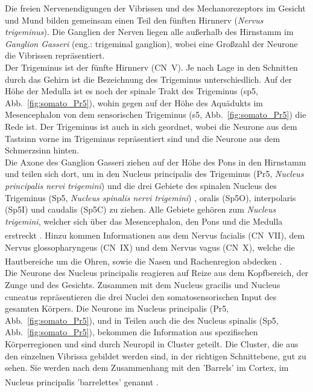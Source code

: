 Die freien Nervenendigungen der Vibrissen und des Mechanorezeptors im Gesicht und Mund bilden gemeinsam einen Teil den fünften Hirnnerv (\textit{Nervus trigeminus}). Die Ganglien der Nerven liegen alle außerhalb des Hirnstamm im \textit{Ganglion Gasseri} (eng.: trigeminal ganglion), wobei eine Großzahl der Neurone die Vibrissen repräsentiert.
\\
\noindent
Der Trigeminus ist der fünfte Hirnnerv (CN~V). Je nach Lage in den Schnitten durch das Gehirn ist die Bezeichnung des Trigeminus unterschiedlich. Auf der Höhe der Medulla ist es noch der spinale Trakt des Trigeminus (sp5, Abb.~\ref{fig:somato_Pr5}), wohin gegen auf der Höhe des Aquädukts im Mesencephalon von dem sensorischen Trigeminus  (s5, Abb.~\ref{fig:somato_Pr5}) die Rede ist. Der Trigeminus ist auch in sich geordnet, wobei die Neurone aus dem Tastsinn vorne im Trigeminus repräsentiert sind und die Neurone aus dem Schmerzsinn hinten.
\\
\noindent
Die Axone des Ganglion Gasseri ziehen auf der Höhe des Pons in den Hirnstamm und teilen sich dort, um in den Nucleus principalis des Trigeminus (Pr5, \textit{Nucleus principalis nervi trigemini})  und die drei Gebiete des spinalen Nucleus des Trigeminus (Sp5, \textit{Nucleus spinalis nervi trigemini}) , oralis (Sp5O), interpolaris (Sp5I) und caudalis (Sp5C) zu ziehen. Alle Gebiete gehören zum \textit{Nucleus trigemini}, welcher sich über das Mesencephalon, den Pons und die Medulla erstreckt \textsuperscript{\cite[Kap.~5]{heldmaier2003tierphysiologie}}. 
Hinzu kommen Informationen aus dem Nervus facialis (CN~VII), dem Nervus glossopharyngeus  (CN~IX) und dem Nervus vagus (CN~X), welche die Hautbereiche um die Ohren, sowie die Nasen und Rachenregion abdecken
\textsuperscript{\cite[Kap.~12]{neurowissenschaften_baer}}.
\\
\noindent Die Neurone des Nucleus principalis reagieren auf Reize aus dem Kopfbereich, der Zunge und des Gesichts. Zusammen mit dem Nucleus gracilis und Nucleus cuneatus repräsentieren die drei Nuclei den somatosensorischen Input des gesamten Körpers. Die Neurone im Nucleus principalis (Pr5, Abb.~\ref{fig:somato_Pr5}), und in Teilen auch die des Nucleus spinalis (Sp5, Abb.~\ref{fig:somato_Pr5}), bekommen die Information aus spezifischen Körperregionen und sind durch Neuropil in Cluster geteilt. Die Cluster, die aus den einzelnen Vibrissa gebildet werden sind, in der richtigen Schnittebene, gut zu sehen. Sie werden nach dem Zusammenhang mit den 'Barrels' im Cortex, im Nucleus principalis 'barrelettes' genannt \textsuperscript{\cite[Kap.~5]{heldmaier2003tierphysiologie}}.

